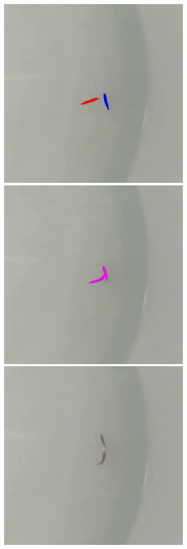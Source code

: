\documentclass{article}
\newlength{\mylen}
\begin{document}
\begin{figure}[H]
	\centering
	\setlength{\mylen}{0.32\linewidth}
	\includegraphics[height=\mylen]{overlap-event1}%
	\hspace{0.01\linewidth}%
	\includegraphics[height=\mylen]{overlap-event2}%
	\hspace{0.01\linewidth}%
	\includegraphics[height=\mylen]{overlap-event3}

\end{figure}
\end{document}
